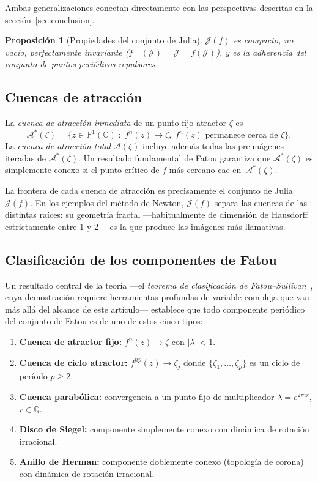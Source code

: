 \documentclass[11pt,a4paper]{article}
\theoremstyle{plain}
\newtheorem{proposicion}[teorema]{Proposición}
\theoremstyle{definition}
\theoremstyle{remark}
\newcommand{\Puno}{\mathbb{P}^1(\mathbb{C})}
\begin{document}
Ambas generalizaciones conectan directamente con las perspectivas
descritas en la sección~\ref{sec:conclusion}.

\begin{proposicion}[Propiedades del conjunto de Julia]
$\mathcal{J}(f)$ es compacto, no vacío, perfectamente invariante
($f^{-1}(\mathcal{J})=\mathcal{J}=f(\mathcal{J})$), y es la
adherencia del conjunto de puntos periódicos repulsores.
\end{proposicion}

\subsection{Cuencas de atracción}

La \emph{cuenca de atracción inmediata} de un punto fijo atractor
$\zeta$ es
\[
  \mathcal{A}^*(\zeta)=\{z\in\Puno\;:\;f^n(z)\to\zeta,\;
  f^n(z)\text{ permanece cerca de }\zeta\}.
\]
La \emph{cuenca de atracción total} $\mathcal{A}(\zeta)$ incluye
además todas las preimágenes iteradas de $\mathcal{A}^*(\zeta)$.
Un resultado fundamental de Fatou garantiza que $\mathcal{A}^*(\zeta)$
es simplemente conexo si el punto crítico de $f$ más cercano cae en~$\mathcal{A}^*(\zeta)$.

La frontera de cada cuenca de atracción es precisamente el conjunto
de Julia $\mathcal{J}(f)$.
En los ejemplos del método de Newton, $\mathcal{J}(f)$ separa las
cuencas de las distintas raíces: su geometría fractal —habitualmente
de dimensión de Hausdorff estrictamente entre 1 y 2— es la que produce
las imágenes más llamativas.

\subsection{Clasificación de los componentes de Fatou}

Un resultado central de la teoría —el \emph{teorema de clasificación de Fatou--Sullivan}~\cite{Milnor2006}, cuya demostración requiere herramientas profundas de variable compleja que van más allá del alcance de este artículo— establece que todo
componente periódico del conjunto de Fatou es de uno de estos cinco
tipos:

\begin{enumerate}
  \item \textbf{Cuenca de atractor fijo:} $f^n(z)\to\zeta$ con $|\lambda|<1$.
  \item \textbf{Cuenca de ciclo atractor:} $f^{np}(z)\to\zeta_j$ donde
        $\{\zeta_1,\ldots,\zeta_p\}$ es un ciclo de período $p\geq 2$.
  \item \textbf{Cuenca parabólica:} convergencia a un punto fijo de
        multiplicador $\lambda=e^{2\pi i r}$, $r\in\mathbb{Q}$.
  \item \textbf{Disco de Siegel:} componente simplemente conexo con
        dinámica de rotación irracional.
  \item \textbf{Anillo de Herman:} componente doblemente conexo (topología de corona)
        con dinámica de rotación irracional.
\end{enumerate}
\end{document}
